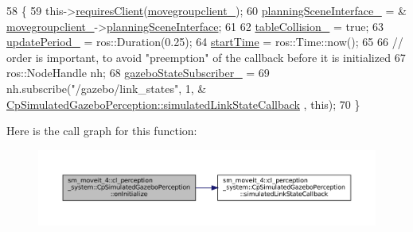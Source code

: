 \begin{DoxyCode}
58             \{
59                 this->\hyperlink{classsmacc_1_1ISmaccComponent_a36c085d906fbae0fcaee817aaeafebf4}{requiresClient}(\hyperlink{classsm__moveit__4_1_1cl__perception__system_1_1CpSimulatedGazeboPerception_a3c361c94d4a8077d9bfac016a2614056}{movegroupclient\_});
60                 \hyperlink{classsm__moveit__4_1_1cl__perception__system_1_1CpSimulatedGazeboPerception_a34bbc7a8b23a1b1c2d3d4d30bd2fe767}{planningSceneInterface\_} = &
      \hyperlink{classsm__moveit__4_1_1cl__perception__system_1_1CpSimulatedGazeboPerception_a3c361c94d4a8077d9bfac016a2614056}{movegroupclient\_}->\hyperlink{classmoveit__z__client_1_1ClMoveGroup_a21c879b2683286aa21ce68f40195b4b5}{planningSceneInterface};
61 
62                 \hyperlink{classsm__moveit__4_1_1cl__perception__system_1_1CpSimulatedGazeboPerception_a64beecc85d97c62bc4f884f4601d9c6a}{tableCollision\_} = \textcolor{keyword}{true};
63                 \hyperlink{classsm__moveit__4_1_1cl__perception__system_1_1CpSimulatedGazeboPerception_a185c4065558b0c320d73f366bb6b8277}{updatePeriod\_} = ros::Duration(0.25);
64                 \hyperlink{classsm__moveit__4_1_1cl__perception__system_1_1CpSimulatedGazeboPerception_af27dcb3530d5f2e8919f5e617b46275c}{startTime} = ros::Time::now();
65                 
66                 \textcolor{comment}{// order is important, to avoid "preemption" of the callback before it is initialized}
67                 ros::NodeHandle nh;
68                 \hyperlink{classsm__moveit__4_1_1cl__perception__system_1_1CpSimulatedGazeboPerception_a0808beb5b57079d863a56258279e202f}{gazeboStateSubscriber\_} =
69                     nh.subscribe(\textcolor{stringliteral}{"/gazebo/link\_states"}, 1, &
      \hyperlink{classsm__moveit__4_1_1cl__perception__system_1_1CpSimulatedGazeboPerception_a7914ffd20518c866a8a1e11254589d12}{CpSimulatedGazeboPerception::simulatedLinkStateCallback}
      , \textcolor{keyword}{this});
70             \}
\end{DoxyCode}
Here is the call graph for this function\+:
\nopagebreak
\begin{figure}[H]
\begin{center}
\leavevmode
\includegraphics[width=350pt]{classsm__moveit__4_1_1cl__perception__system_1_1CpSimulatedGazeboPerception_adebc30f6b1fc905f783de3f7bdf4a711_cgraph}
\end{center}
\end{figure}
